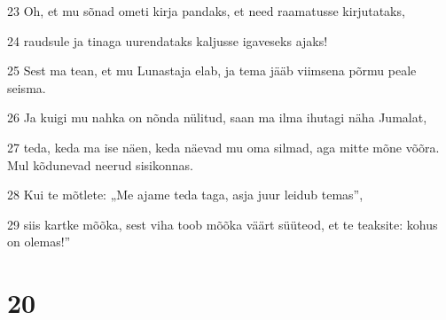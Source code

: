 \par 23 Oh, et mu sõnad ometi kirja pandaks, et need raamatusse kirjutataks,
\par 24 raudsule ja tinaga uurendataks kaljusse igaveseks ajaks!
\par 25 Sest ma tean, et mu Lunastaja elab, ja tema jääb viimsena põrmu peale seisma.
\par 26 Ja kuigi mu nahka on nõnda nülitud, saan ma ilma ihutagi näha Jumalat,
\par 27 teda, keda ma ise näen, keda näevad mu oma silmad, aga mitte mõne võõra. Mul kõdunevad neerud sisikonnas.
\par 28 Kui te mõtlete: „Me ajame teda taga, asja juur leidub temas”,
\par 29 siis kartke mõõka, sest viha toob mõõka väärt süüteod, et te teaksite: kohus on olemas!”

\chapter{20}

